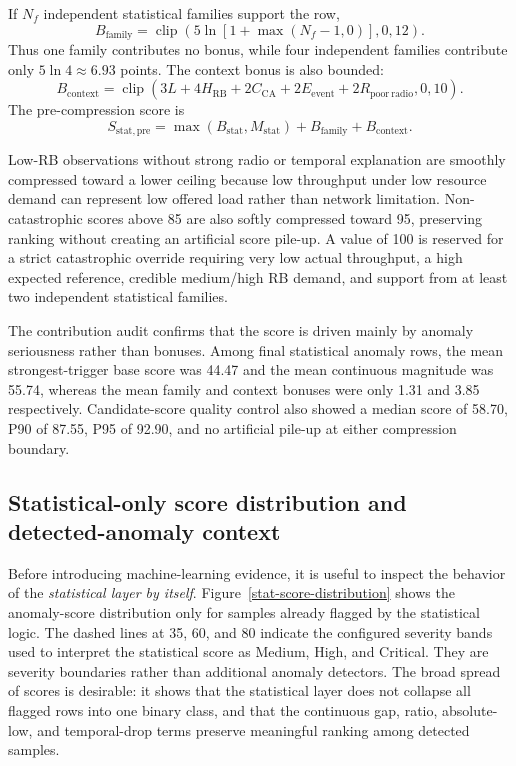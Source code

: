 If $N_f$ independent statistical families support the row,
\begin{equation}
B_{\mathrm{family}}=\operatorname{clip}\left(5\ln\left[1+\max(N_f-1,0)\right],0,12\right).
\end{equation}
Thus one family contributes no bonus, while four independent families contribute only $5\ln 4\approx6.93$ points. The context bonus is also bounded:
\begin{equation}
B_{\mathrm{context}}=\operatorname{clip}\left(3L+4H_{\mathrm{RB}}+2C_{\mathrm{CA}}+2E_{\mathrm{event}}+2R_{\mathrm{poor\ radio}},0,10\right).
\end{equation}
The pre-compression score is
\begin{equation}
S_{\mathrm{stat,pre}}=\max(B_{\mathrm{stat}},M_{\mathrm{stat}})+B_{\mathrm{family}}+B_{\mathrm{context}}.
\end{equation}

Low-RB observations without strong radio or temporal explanation are smoothly compressed toward a lower ceiling because low throughput under low resource demand can represent low offered load rather than network limitation. Non-catastrophic scores above 85 are also softly compressed toward 95, preserving ranking without creating an artificial score pile-up. A value of 100 is reserved for a strict catastrophic override requiring very low actual throughput, a high expected reference, credible medium/high RB demand, and support from at least two independent statistical families.

The contribution audit confirms that the score is driven mainly by anomaly seriousness rather than bonuses. Among final statistical anomaly rows, the mean strongest-trigger base score was 44.47 and the mean continuous magnitude was 55.74, whereas the mean family and context bonuses were only 1.31 and 3.85 respectively. Candidate-score quality control also showed a median score of 58.70, P90 of 87.55, P95 of 92.90, and no artificial pile-up at either compression boundary.

\subsection{Statistical-only score distribution and detected-anomaly context}

Before introducing machine-learning evidence, it is useful to inspect the behavior of the \emph{statistical layer by itself}. Figure~\ref{stat-score-distribution} shows the anomaly-score distribution only for samples already flagged by the statistical logic. The dashed lines at 35, 60, and 80 indicate the configured severity bands used to interpret the statistical score as Medium, High, and Critical. They are severity boundaries rather than additional anomaly detectors. The broad spread of scores is desirable: it shows that the statistical layer does not collapse all flagged rows into one binary class, and that the continuous gap, ratio, absolute-low, and temporal-drop terms preserve meaningful ranking among detected samples.

